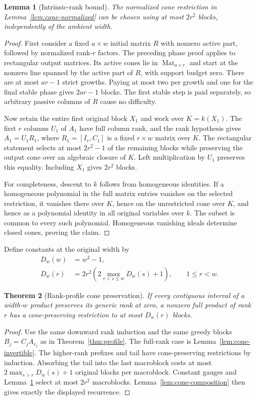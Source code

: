 \documentclass[11pt]{article}
\newtheorem{theorem}{Theorem}[section]
\newtheorem{lemma}[theorem]{Lemma}
\theoremstyle{definition}\newtheorem{definition}[theorem]{Definition}
\theoremstyle{remark}\newtheorem{remark}[theorem]{Remark}
\newcommand{\Mat}{\operatorname{Mat}}
\begin{document}
\begin{lemma}[Intrinsic-rank bound]\label{lem:intrinsic-cone}
The normalized cone restriction in Lemma~\ref{lem:cone-normalized} can
be chosen using at most $2r^2$ blocks, independently of the ambient width.
\end{lemma}
\begin{proof}
First consider a fixed $a\times w$ initial matrix $R$ with nonzero active
part, followed by normalized rank-$r$ factors. The preceding phase proof
applies to rectangular output matrices. Its active cones lie in
$\Mat_{a\times r}$ and start at the nonzero line spanned by the active
part of $R$, with support budget zero. There are at most $ar-1$ strict
growths. Paying at most two per growth and one for the final stable
phase gives $2ar-1$ blocks. The first stable step is paid separately,
so arbitrary passive columns of $R$ cause no difficulty.

Now retain the entire first original block $X_1$ and work over
$K=k(X_1)$. The first $r$ columns $U_1$ of $A_1$ have full column rank,
and the rank hypothesis gives $A_1=U_1R_1$, where $R_1=[I_r,C_1]$ is
a fixed $r\times w$ matrix over $K$. The rectangular statement selects
at most $2r^2-1$ of the remaining blocks while preserving the output cone
over an algebraic closure of $K$. Left multiplication by $U_1$ preserves
this equality. Including $X_1$ gives $2r^2$ blocks.

For completeness, descent to $k$ follows from homogeneous identities.
If a homogeneous polynomial in the full matrix entries vanishes on the
selected restriction, it vanishes there over $K$, hence on the unrestricted
cone over $K$, and hence as a polynomial identity in all original
variables over $k$. The subset is common to every such polynomial.
Homogeneous vanishing ideals determine closed cones, proving the claim.
\end{proof}

Define constants at the original width by
\begin{align*}
 D_w(w)&=w^2-1,\\
 D_w(r)&=2r^2\left(2\max_{r<s\le w}D_w(s)+1\right),\qquad 1\le r<w.
\end{align*}
\begin{theorem}[Rank-profile cone preservation]\label{thm:cone-profile}
If every contiguous interval of a width-$w$ product preserves its generic
rank at zero, a nonzero full product of rank $r$ has a cone-preserving
restriction to at most $D_w(r)$ blocks.
\end{theorem}
\begin{proof}
Use the same downward rank induction and the same greedy blocks
$B_j=C_jA_{e_j}$ as in Theorem~\ref{thm:profile}. The full-rank case is
Lemma~\ref{lem:cone-invertible}. The higher-rank prefixes and tail have
cone-preserving restrictions by induction. Absorbing the tail into the
last macroblock costs at most $2\max_{s>r}D_w(s)+1$ original blocks
per macroblock. Constant gauges and Lemma~\ref{lem:intrinsic-cone}
select at most $2r^2$ macroblocks. Lemma~\ref{lem:cone-composition} then
gives exactly the displayed recurrence.
\end{proof}
\end{document}
